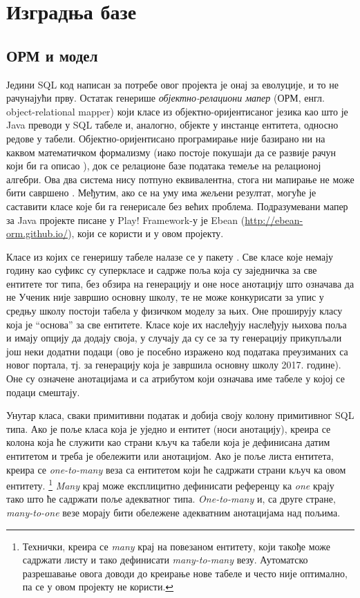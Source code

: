 \section{Изградња базе}\label{sec:4.4}

\subsection{ОРМ и модел}

Једини SQL код написан за потребе овог пројекта је онај за еволуције, и то не рачунајући прву. Остатак генерише \emph{објектно-релациони мапер} (ОРМ, енгл. object-relational mapper) који класе из објектно-оријентисаног језика као што је Java преводи у SQL табеле и, аналогно, објекте у инстанце ентитета, односно редове у табели. Објектно-оријентисано програмирање није базирано ни на каквом математичком формализму (иако постоје покушаји да се развије рачун који би га описао \citep{abadi2012theory}), док се релационе базе података темеље на релационој алгебри. Ова два система нису потпуно еквивалентна, стога ни мапирање не може бити савршено \citep{barnes2007object}. Међутим, ако се на уму има жељени резултат, могуће је саставити класе које би га генерисале без већих проблема. Подразумевани мапер за Java пројекте писане у Play! Framework-у је Ebean (\url{http://ebean-orm.github.io/}), који се користи и у овом пројекту.

Класе из којих се генеришу табеле налазе се у пакету . Све класе које немају годину као суфикс су суперкласе и садрже поља која су заједничка за све ентитете тог типа, без обзира на генерацију и оне носе анотацију  што означава да не
Ученик није завршио основну школу, те не може конкурисати за упис у средњу школу
 постоји табела у физичком моделу за њих. Оне проширују класу  која је \enquote{основа} за све ентитете. Класе које их наслеђују наслеђују њихова поља и имају опцију да додају своја, у случају да су се за ту генерацију прикупљали још неки додатни подаци (ово је посебно изражено код података преузиманих са новог портала, тј. за генерацију која је завршила основну школу 2017. године). Оне су означене анотацијама  и  са атрибутом  који означава име табеле у којој се подаци смештају.

Унутар класа, сваки примитивни податак и  добија своју колону примитивног SQL типа. Ако је поље класа која је уједно и ентитет (носи  анотацију), креира се колона која ће служити као страни кључ ка табели која је дефинисана датим ентитетом и треба је обележити  или  анотацијом. Ако је поље листа ентитета, креира се \emph{one-to-many} веза са ентитетом који ће садржати страни кључ ка овом ентитету. \footnote{Технички, креира се \textit{many} крај на повезаном ентитету, који такође може садржати листу и тако дефинисати \emph{many-to-many} везу. Аутоматско разрешавање овога доводи до креирање нове табеле и често није оптимално, па се у овом пројекту не користи.} \textit{Many} крај може експлицитно дефинисати референцу ка \textit{one} крају тако што ће садржати поље адекватног типа. \textit{One-to-many} и, са друге стране, \emph{many-to-one} везе морају бити обележене адекватним анотацијама над пољима.

